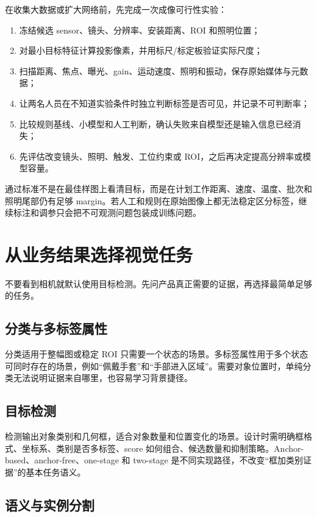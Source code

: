 在收集大数据或扩大网络前，先完成一次成像可行性实验：

\begin{enumerate}
  \item 冻结候选 sensor、镜头、分辨率、安装距离、ROI 和照明位置；
  \item 对最小目标特征计算投影像素，并用标尺/标定板验证实际尺度；
  \item 扫描距离、焦点、曝光、gain、运动速度、照明和振动，保存原始媒体与元数据；
  \item 让两名人员在不知道实验条件时独立判断标签是否可见，并记录不可判断率；
  \item 比较规则基线、小模型和人工判断，确认失败来自模型还是输入信息已经消失；
  \item 先评估改变镜头、照明、触发、工位约束或 ROI，之后再决定提高分辨率或模型容量。
\end{enumerate}

通过标准不是在最佳样图上看清目标，而是在计划工作距离、速度、温度、批次和照明尾部仍有足够 margin。若人工和规则在原始图像上都无法稳定区分标签，继续标注和调参只会把不可观测问题包装成训练问题。

\section{从业务结果选择视觉任务}

不要看到相机就默认使用目标检测。先问产品真正需要的证据，再选择最简单足够的任务。

\subsection{分类与多标签属性}

分类适用于整幅图或稳定 ROI 只需要一个状态的场景。多标签属性用于多个状态可同时存在的场景，例如“佩戴手套”和“手部进入区域”。需要对象位置时，单纯分类无法说明证据来自哪里，也容易学习背景捷径。

\subsection{目标检测}

检测输出对象类别和几何框，适合对象数量和位置变化的场景。设计时需明确框格式、坐标系、类别是否多标签、score 如何组合、候选数量和抑制策略。Anchor-based、anchor-free、one-stage 和 two-stage 是不同实现路径，不改变“框加类别证据”的基本任务语义\cite{faster-rcnn,yolov1,fcos}。

\subsection{语义与实例分割}

